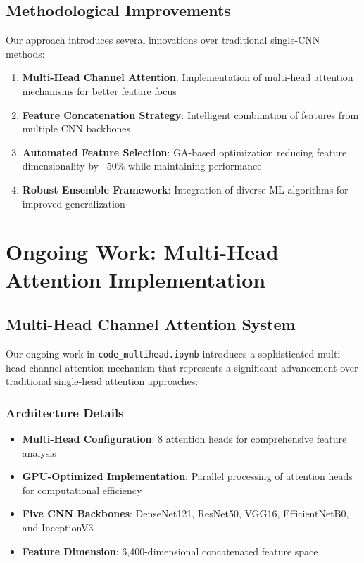 \documentclass[journal]{IEEEtran}
\begin{document}
\subsection{Methodological Improvements}

Our approach introduces several innovations over traditional single-CNN methods:

\begin{enumerate}
    \item \textbf{Multi-Head Channel Attention}: Implementation of multi-head attention mechanisms for better feature focus
    \item \textbf{Feature Concatenation Strategy}: Intelligent combination of features from multiple CNN backbones
    \item \textbf{Automated Feature Selection}: GA-based optimization reducing feature dimensionality by ~50\% while maintaining performance
    \item \textbf{Robust Ensemble Framework}: Integration of diverse ML algorithms for improved generalization
\end{enumerate}

\section{Ongoing Work: Multi-Head Attention Implementation}

\subsection{Multi-Head Channel Attention System}

Our ongoing work in \texttt{code\_multihead.ipynb} introduces a sophisticated multi-head channel attention mechanism that represents a significant advancement over traditional single-head attention approaches:

\subsubsection{Architecture Details}

\begin{itemize}
    \item \textbf{Multi-Head Configuration}: 8 attention heads for comprehensive feature analysis
    \item \textbf{GPU-Optimized Implementation}: Parallel processing of attention heads for computational efficiency
    \item \textbf{Five CNN Backbones}: DenseNet121, ResNet50, VGG16, EfficientNetB0, and InceptionV3
    \item \textbf{Feature Dimension}: 6,400-dimensional concatenated feature space
\end{itemize}
\end{document}
